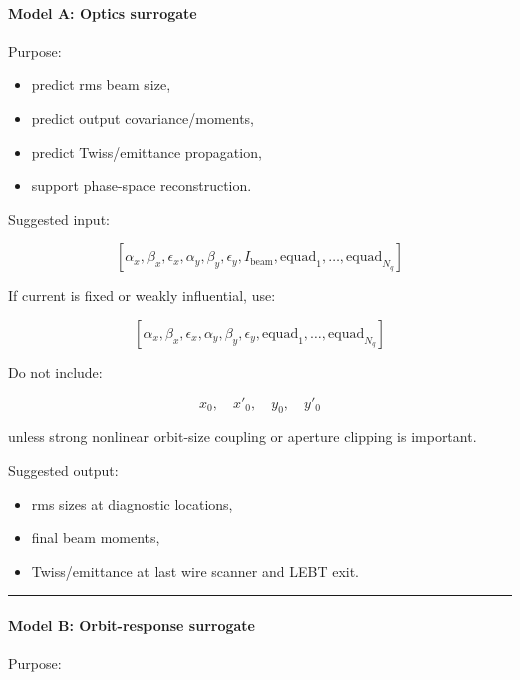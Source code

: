 \documentclass[
]{article}
\providecommand{\tightlist}{%
  \setlength{\itemsep}{0pt}\setlength{\parskip}{0pt}}
\begin{document}
\hypertarget{model-a-optics-surrogate}{%
\paragraph{Model A: Optics surrogate}\label{model-a-optics-surrogate}}

Purpose:

\begin{itemize}
\tightlist
\item
  predict rms beam size,
\item
  predict output covariance/moments,
\item
  predict Twiss/emittance propagation,
\item
  support phase-space reconstruction.
\end{itemize}

Suggested input:

\[
[
\alpha_x,\beta_x,\epsilon_x,
\alpha_y,\beta_y,\epsilon_y,
I_{\mathrm{beam}},
\mathrm{equad}_1,\ldots,\mathrm{equad}_{N_q}
]
\]

If current is fixed or weakly influential, use:

\[
[
\alpha_x,\beta_x,\epsilon_x,
\alpha_y,\beta_y,\epsilon_y,
\mathrm{equad}_1,\ldots,\mathrm{equad}_{N_q}
]
\]

Do not include:

\[
x_0,\quad x'_0,\quad y_0,\quad y'_0
\]

unless strong nonlinear orbit-size coupling or aperture clipping is
important.

Suggested output:

\begin{itemize}
\tightlist
\item
  rms sizes at diagnostic locations,
\item
  final beam moments,
\item
  Twiss/emittance at last wire scanner and LEBT exit.
\end{itemize}

\begin{center}\rule{0.5\linewidth}{0.5pt}\end{center}

\hypertarget{model-b-orbit-response-surrogate}{%
\paragraph{Model B: Orbit-response
surrogate}\label{model-b-orbit-response-surrogate}}

Purpose:
\end{document}
